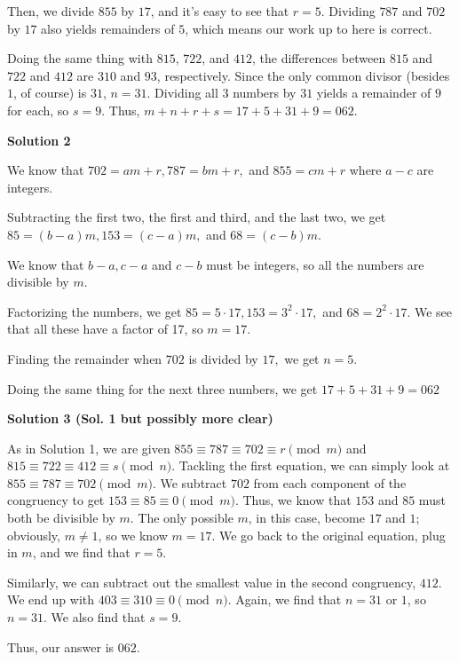 \begin{enumerate}
 Then, we divide $855$ by $17$, and it's easy to see that $r = 5$. Dividing $787$ and $702$ by $17$ also yields remainders of $5$, which means our work up to here is correct.

 Doing the same thing with $815$, $722$, and $412$, the differences between $815$ and $722$ and $412$ are $310$ and $93$, respectively. Since the only common divisor (besides $1$, of course) is $31$, $n = 31$. Dividing all $3$ numbers by $31$ yields a remainder of $9$ for each, so $s = 9$. Thus, $m + n + r + s = 17 + 5 + 31 + 9 = \boxed{062}$.

 



\textbf{Solution 2}

We know that $702 = am + r, 787 = bm + r,$ and $855 = cm+r$ where $a-c$ are integers.

 Subtracting the first two, the first and third, and the last two, we get $85 = (b-a)m, 153=(c-a)m,$ and $68=(c-b)m.$

 We know that $b-a, c-a$ and $c-b$ must be integers, so all the numbers are divisible by $m.$ 

 Factorizing the numbers, we get $85 = 5 \cdot 17, 153 = 3^2 \cdot 17,$ and $68 = 2^2 \cdot 17.$ We see that all these have a factor of 17, so $m=17.$

 Finding the remainder when $702$ is divided by $17,$ we get $n=5.$

 Doing the same thing for the next three numbers, we get $17 + 5 + 31 + 9 = \boxed{062}$




\textbf{Solution 3 (Sol. 1 but possibly more clear)}

As in Solution 1, we are given $855\equiv787\equiv702\equiv r\pmod{m}$ and $815\equiv722\equiv412\equiv s\pmod{n}.$ Tackling the first equation, we can simply look at $855\equiv787\equiv702\pmod{m}$. We subtract $702$ from each component of the congruency to get $153\equiv85\equiv0\pmod{m}$. Thus, we know that $153$ and $85$ must both be divisible by $m$. The only possible $m$, in this case, become $17$ and $1$; obviously, $m\neq1$, so we know $m=17$. We go back to the original equation, plug in $m$, and we find that $r=5$. 

 Similarly, we can subtract out the smallest value in the second congruency, $412$. We end up with $403\equiv310\equiv0\pmod{n}$. Again, we find that $n=31$ or $1$, so $n=31$. We also find that $s=9$. 

 Thus, our answer is $\boxed{062}$. 


\end{enumerate}
